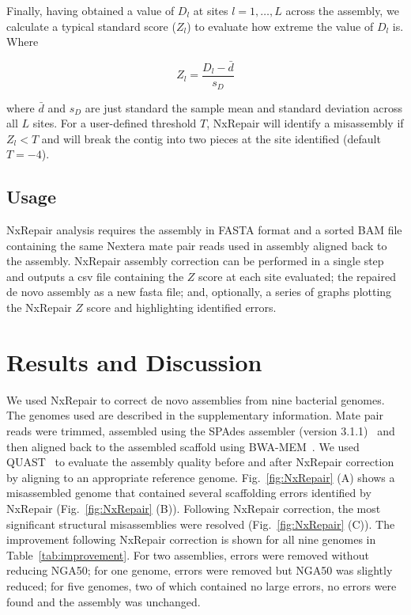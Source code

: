 \documentclass{bioinfo}
\begin{document}
\begin{methods}
Finally, having obtained a value of $D_l$ at sites $l = 1,\ldots,L$ across the assembly, we calculate a typical standard score ($Z_l$) to evaluate how extreme the value of $D_l$ is. Where

\begin{equation}
Z_l=\frac{D_l - \bar{d}}{s_D}
\label{eq:zscore}
\end{equation}

where $\bar{d}$ and $s_D$ are just standard the sample mean and standard deviation across all $L$ sites. For a user-defined threshold $T$, NxRepair will identify a misassembly if $Z_l < T$ and will break the contig into two pieces at the site identified  (default $T=-4$).




\subsection{Usage}
NxRepair analysis requires the assembly in FASTA format and a sorted BAM file containing the same Nextera mate pair reads used in assembly aligned back to the assembly. NxRepair assembly correction can be performed in a single step and outputs a csv file containing the $Z$ score at each site evaluated; the repaired de novo assembly as a new fasta file; and, optionally, a series of graphs plotting the NxRepair $Z$ score and highlighting identified errors.   

\end{methods}


\section{Results and Discussion}
We used NxRepair to correct de novo assemblies from nine bacterial genomes. The genomes used are described in the supplementary information. Mate pair reads were trimmed, assembled using the SPAdes assembler (version 3.1.1)~\citep{bankevich2012} and then aligned back to the assembled scaffold using BWA-MEM~\citep{li2013}. We used QUAST~\citep{gurevich2013} to evaluate the assembly quality before and after NxRepair correction by aligning to an appropriate reference genome. Fig.~\ref{fig:NxRepair} (A) shows a misassembled genome that contained several scaffolding errors identified by NxRepair (Fig.~\ref{fig:NxRepair} (B)). Following NxRepair correction, the most significant structural misassemblies were resolved (Fig.~\ref{fig:NxRepair} (C)). The improvement following NxRepair correction is shown for all nine genomes in Table~\ref{tab:improvement}. For two assemblies, errors were removed without reducing NGA50; for one genome, errors were removed but NGA50 was slightly reduced; for five genomes, two of which contained no large errors, no errors were found and the assembly was unchanged.
\end{document}
